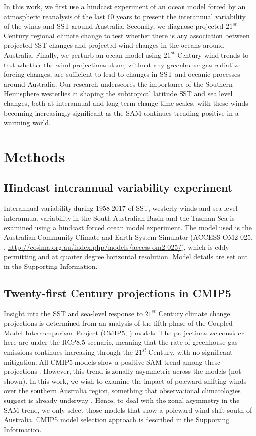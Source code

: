 \documentclass[draft,linenumbers]{agujournal2018}
\begin{document}
In this work, we first use a hindcast experiment of an ocean model forced by an atmospheric reanalysis of the last 60 years to present the interannual variability of the winds and SST around Australia. Secondly, we diagnose projected $21^{st}$ Century regional climate change to test whether there is any association between projected SST changes and projected wind changes in the oceans around Australia. Finally, we perturb an ocean model using $21^{st}$ Century wind trends to test whether the wind projections alone, without any greenhouse gas radiative forcing changes, are sufficient to lead to changes in SST and oceanic processes around Australia. Our research underscores the importance of the Southern Hemisphere westerlies in shaping the subtropical latitude SST and sea level changes, both at interannual and long-term change time-scales, with these winds becoming increasingly significant as the SAM continues trending positive in a warming world.



\section{Methods}
\subsection{Hindcast interannual variability experiment}
Interannual variability during 1958-2017 of SST, westerly winds and sea-level interannual variability in the South Australian Basin and the Tasman Sea is examined using a hindcast forced ocean model experiment. The model used is the Australian Community Climate and Earth-System Simulator (ACCESS-OM2-025, \citealp{Bi2012}, \url{http://cosima.org.au/index.php/models/access-om2-025/}), which is eddy-permitting and at quarter degree horizontal resolution. Model details are set out in the Supporting Information.

\subsection{Twenty-first Century projections in CMIP5} \label{Twenty-first Century analysis in CMIP5}
Insight into the SST and sea-level response to $21^{st}$ Century climate change projections is determined from an analysis of the fifth phase of the Coupled Model Intercomparison Project (CMIP5, \citealp{Taylor2012}) models. The projections we consider here are under the RCP8.5 scenario, meaning that the rate of greenhouse gas emissions continues increasing through the $21^{st}$ Century, with no significant mitigation. All CMIP5 models show a positive SAM trend among these projections \citep{Bracegirdle2013}. However, this trend is zonally asymmetric across the models (not shown). In this work, we wish to examine the impact of poleward shifting winds over the southern Australia region, something that observational climatologies suggest is already underway \citep{Reichler2016}. Hence, to deal with the zonal asymmetry in the SAM trend, we only select those models that show a poleward wind shift south of Australia. CMIP5 model selection approach is described in the Supporting Information.
\end{document}
